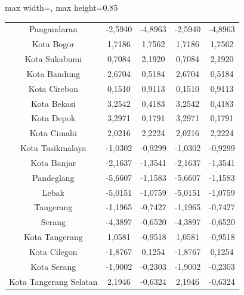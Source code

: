 \begin{table}[H]
\begin{adjustbox}{max width=\textwidth, max height=0.85\textheight}
\begin{tabular}{|c|c|c|c|c|}
Pangandaran & -2,5940 & -4,8963 & -2,5940 & -4,8963 \\
Kota Bogor & 1,7186 & 1,7562 & 1,7186 & 1,7562 \\
Kota Sukabumi & 0,7084 & 2,1920 & 0,7084 & 2,1920 \\
Kota Bandung & 2,6704 & 0,5184 & 2,6704 & 0,5184 \\
Kota Cirebon & 0,1510 & 0,9113 & 0,1510 & 0,9113 \\
Kota Bekasi & 3,2542 & 0,4183 & 3,2542 & 0,4183 \\
Kota Depok & 3,2971 & 0,1791 & 3,2971 & 0,1791 \\
Kota Cimahi & 2,0216 & 2,2224 & 2,0216 & 2,2224 \\
Kota Tasikmalaya & -1,0302 & -0,9299 & -1,0302 & -0,9299 \\
Kota Banjar & -2,1637 & -1,3541 & -2,1637 & -1,3541 \\
Pandeglang & -5,6607 & -1,1583 & -5,6607 & -1,1583 \\
Lebak & -5,0151 & -1,0759 & -5,0151 & -1,0759 \\
Tangerang & -1,1965 & -0,7427 & -1,1965 & -0,7427 \\
Serang & -4,3897 & -0,6520 & -4,3897 & -0,6520 \\
Kota Tangerang & 1,0581 & -0,9518 & 1,0581 & -0,9518 \\
Kota Cilegon & -1,8767 & 0,1254 & -1,8767 & 0,1254 \\
Kota Serang & -1,9002 & -0,2303 & -1,9002 & -0,2303 \\
Kota Tangerang Selatan & 2,1946 & -0,6324 & 2,1946 & -0,6324 \\
\hline
\end{tabular}
\end{adjustbox}
\end{table}
